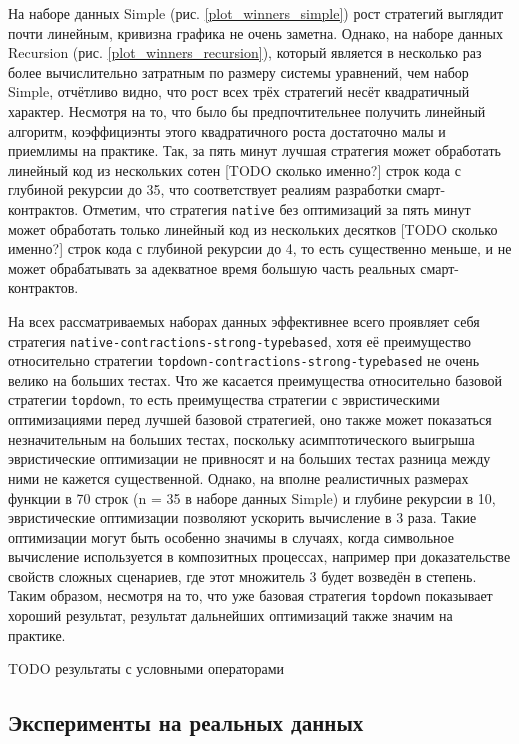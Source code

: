 \documentclass[../diploma.tex]{subfiles}
\begin{document}
На наборе данных Simple (рис. \ref{plot_winners_simple}) рост стратегий выглядит почти линейным, кривизна графика не очень заметна. Однако, на наборе данных Recursion (рис. \ref{plot_winners_recursion}), который является в несколько раз более вычислительно затратным по размеру системы уравнений, чем набор Simple, отчётливо видно, что рост всех трёх стратегий несёт квадратичный характер. Несмотря на то, что было бы предпочтительнее получить линейный алгоритм, коэффициэнты этого квадратичного роста достаточно малы и приемлимы на практике. Так, за пять минут лучшая стратегия может обработать линейный код из нескольких сотен [TODO сколько именно?] строк кода с глубиной рекурсии до 35, что соответствует реалиям разработки смарт-контрактов. Отметим, что стратегия \texttt{native} без оптимизаций за пять минут может обработать только линейный код из нескольких десятков [TODO сколько именно?] строк кода с глубиной рекурсии до 4, то есть существенно меньше, и не может обрабатывать за адекватное время большую часть реальных смарт-контрактов.

На всех рассматриваемых наборах данных эффективнее всего проявляет себя стратегия \texttt{native-contractions-strong-typebased}, хотя её преимущество относительно стратегии \texttt{topdown-contractions-strong-typebased} не очень велико на больших тестах. Что же касается преимущества относительно базовой стратегии \texttt{topdown}, то есть преимущества стратегии с эвристическими оптимизациями перед лучшей базовой стратегией, оно также может показаться незначительным на больших тестах, поскольку асимптотического выигрыша эвристические оптимизации не привносят и на больших тестах разница между ними не кажется существенной. Однако, на вполне реалистичных размерах функции в 70 строк (n = 35 в наборе данных Simple) и глубине рекурсии в 10, эвристические оптимизации позволяют ускорить вычисление в 3 раза. Такие оптимизации могут быть особенно значимы в случаях, когда символьное вычисление используется в композитных процессах, например при доказательстве свойств сложных сценариев, где этот множитель 3 будет возведён в степень. Таким образом, несмотря на то, что уже базовая стратегия \texttt{topdown} показывает хороший результат, результат дальнейших оптимизаций также значим на практике.

TODO результаты с условными операторами

\subsection{Эксперименты на реальных данных}
\end{document}
